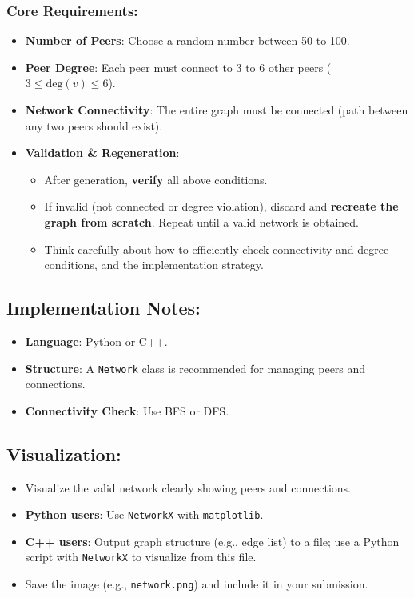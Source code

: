 \documentclass[12pt]{extarticle}
\begin{document}
\subsubsection*{Core Requirements:}
\begin{itemize}
    \item \textbf{Number of Peers}: Choose a random number between 50 to 100.
    \item \textbf{Peer Degree}: Each peer must connect to 3 to 6 other peers ($3 \le \text{deg}(v) \le 6$).
    \item \textbf{Network Connectivity}: The entire graph must be connected (path between any two peers should exist).
    \item \textbf{Validation \& Regeneration}:
          \begin{itemize}
              \item After generation, \textbf{verify} all above conditions.
              \item If invalid (not connected or degree violation), discard and \textbf{recreate the graph from scratch}. Repeat until a valid network is obtained.
              \item Think carefully about how to efficiently check connectivity and degree conditions, and the implementation strategy.
          \end{itemize}
\end{itemize}

\subsection*{Implementation Notes:}
\begin{itemize}
    \item \textbf{Language}: Python or C++.
    \item \textbf{Structure}: A \texttt{Network} class is recommended for managing peers and connections.
    \item \textbf{Connectivity Check}: Use BFS or DFS.
\end{itemize}

\subsection*{Visualization:}
\begin{itemize}
    \item Visualize the valid network clearly showing peers and connections.
    \item \textbf{Python users}: Use \texttt{NetworkX} with \texttt{matplotlib}.
    \item \textbf{C++ users}: Output graph structure (e.g., edge list) to a file; use a Python script with \texttt{NetworkX} to visualize from this file.
    \item Save the image (e.g., \texttt{network.png}) and include it in your submission.
\end{itemize}
\end{document}
